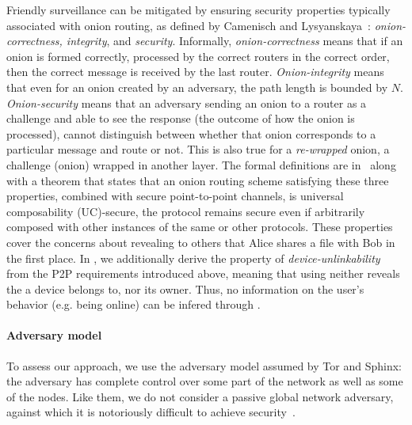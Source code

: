 Friendly surveillance can be mitigated by ensuring security properties 
typically associated with onion routing, as defined by Camenisch and Lysyanskaya~\cite{CLOnionRouting}: 
\textit{onion-correctness, integrity}, and \textit{security}. %
Informally, \textit{onion-correctness} means that if an onion is formed
correctly, processed by the correct routers in the correct order, then
the correct message is received by the last router. \textit{Onion-integrity}
means that even for an onion created by an adversary, the path length
is bounded by $N$. \textit{Onion-security} means that an adversary sending an
 onion to a router as a challenge
 and able to see the response (the outcome of how the
onion is processed), cannot distinguish between whether that onion
corresponds to a particular message and route or not. This is also
true for a \emph{re-wrapped} onion, \ie a challenge (onion) wrapped in
another layer. The formal definitions are in~\cite{CLOnionRouting} along
with a theorem that states that an onion routing scheme satisfying
these three properties, combined with secure point-to-point channels,
is universal composability (UC)-secure, \ie the protocol remains
secure even if arbitrarily composed with other instances of the same or other protocols.
These properties cover the concerns about
revealing to others that Alice shares a file with Bob in the first
place. In \name, we additionally derive the property of
\emph{device-unlinkability} from the \ac{P2P} requirements introduced above, meaning that
using \name neither reveals the \squad a device belongs to, nor its
owner. Thus, no information on the user's behavior (e.g. being online)
can be infered through \name. 



\paragraph*{Adversary model} To assess our approach, we use the
adversary model assumed by Tor and \ac{Sphinx}:
the adversary has complete control over some part of the network as
well as some of the nodes. Like them, we do not consider a passive global network
adversary, against which it is notoriously difficult to achieve
security~\cite{SystemsForAnonymousCommunication}.
